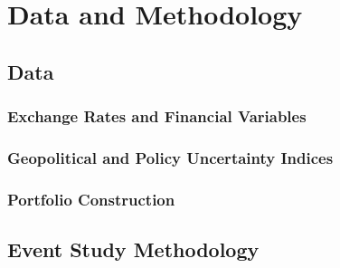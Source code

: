 
\chapter{Data and Methodology}
\label{ch:methodology}



\section{Data}
\label{sec:data}

\subsection{Exchange Rates and Financial Variables}
\label{sec:data_fx}


\subsection{Geopolitical and Policy Uncertainty Indices}
\label{sec:data_gpr}


\subsection{Portfolio Construction}
\label{sec:data_portfolios}



\section{Event Study Methodology}
\label{sec:method_event}

